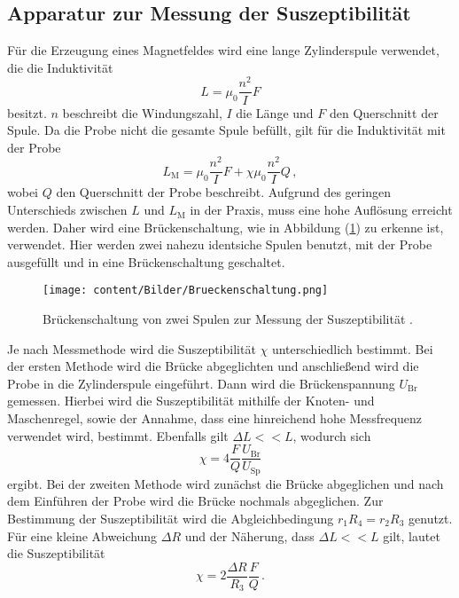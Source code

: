 \subsection{Apparatur zur Messung der Suszeptibilität}
\label{sec:Messapparatur_Suszeptibilität}
Für die Erzeugung eines Magnetfeldes wird eine lange Zylinderspule verwendet, die die Induktivität
\begin{equation}
    L = \mu _0 \frac{n^2}{I}F
    \label{eqn:Induktivität_Vakuum}
\end{equation}
besitzt. $n$ beschreibt die Windungszahl, $I$ die Länge und $F$ den Querschnitt der Spule. Da die 
Probe nicht die gesamte Spule befüllt, gilt für die Induktivität mit der Probe 
\begin{equation}
    L_{\text{M}} = \mu _0 \frac{n^2}{I}F + \chi \mu_0\frac{n^2}{I}Q\,,
    \label{eqn:Induktivität_mitProbe}
\end{equation}
wobei $Q$ den Querschnitt der Probe beschreibt. Aufgrund des geringen Unterschieds zwischen
$L$ und $L_{\text{M}}$ in der Praxis, muss eine hohe Auflösung erreicht werden. Daher wird eine Brückenschaltung, wie
in Abbildung (\ref{fig:Brueckenschaltung}) zu erkenne ist, verwendet. Hier werden zwei nahezu identsiche Spulen benutzt, mit der Probe
ausgefüllt und in eine Brückenschaltung geschaltet. 
\begin{figure}[H]
  \centering
  \texttt{[image: content/Bilder/Brueckenschaltung.png]}
  \caption{Brückenschaltung von zwei Spulen zur Messung der Suszeptibilität \cite{anleitungV606}.}
  \label{fig:Brueckenschaltung}
\end{figure}
Je nach Messmethode wird die Suszeptibilität $\chi$ unterschiedlich bestimmt. Bei der ersten Methode wird die Brücke
abgeglichten und anschließend wird die Probe in die Zylinderspule eingeführt. Dann wird die Brückenspannung $U_{\text{Br}}$ 
gemessen. Hierbei wird die Suszeptibilität mithilfe der Knoten- und Maschenregel, sowie der Annahme, dass eine hinreichend hohe Messfrequenz verwendet wird,
bestimmt. Ebenfalls gilt $\Delta L << L$, wodurch sich 
\begin{equation}
    \chi = 4 \frac{F}{Q}\frac{U_{\text{Br}}}{U_{\text{Sp}}}
    \label{eqn:Suszeptibilität_ersteMethode}
\end{equation}
ergibt.
Bei der zweiten Methode wird zunächst die Brücke abgeglichen und nach dem Einführen der Probe wird die Brücke nochmals abgeglichen. 
Zur Bestimmung der Suszeptibilität wird die Abgleichbedingung $r_1R_4 = r_2R_3$ genutzt. Für eine kleine Abweichung $\Delta R$ und der Näherung, dass
$\Delta L << L$ gilt, lautet die Suszeptibilität
\begin{equation}
    \chi = 2 \frac{\Delta R}{R_3}\frac{F}{Q}\,.
    \label{eqn:Suszeptibilität_zweiteMethode}
\end{equation}


